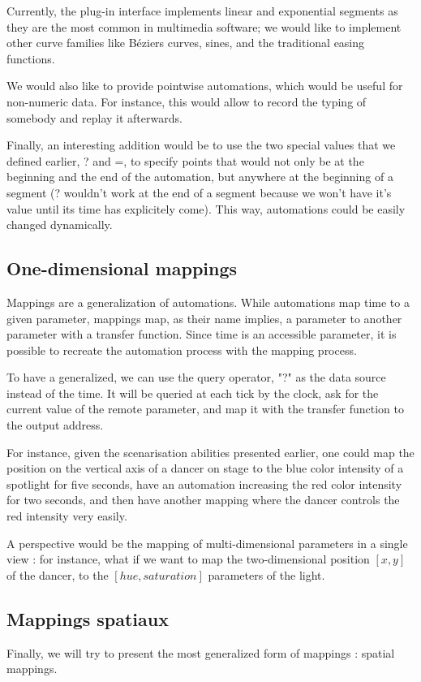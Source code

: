 \documentclass{sigchi}
\begin{document}
Currently, the plug-in interface implements linear and exponential segments as they are the most common in multimedia software; we would like to implement other curve families like Béziers curves, sines, and the traditional easing functions\cite{hudson1993animation}.

We would also like to provide pointwise automations, which would be useful for non-numeric data. For instance, this would allow to record the typing of somebody and replay it afterwards.

Finally, an interesting addition would be to use the two special values that we defined earlier, ? and =, to specify points that would not only be at the beginning and the end of the automation, but anywhere at the beginning of a segment (? wouldn't work at the end of a segment because we won't have it's value until its time has explicitely come). This way, automations could be easily changed dynamically.

\subsection{One-dimensional mappings}
Mappings are a generalization of automations. While automations map time to a given parameter, mappings map, as their name implies, a parameter to another parameter with a transfer function. Since time is an accessible parameter, it is possible to recreate the automation process with the mapping process.

To have a generalized, we can use the query operator, "?" as the data source instead of the time. It will be queried at each tick by the clock, ask for the current value of the remote parameter, and map it with the transfer function to the output address.

For instance, given the scenarisation abilities presented earlier, one could map the position on the vertical axis of a dancer on stage to the blue color intensity of a spotlight for five seconds, have an automation increasing the red color intensity for  two seconds, and then have another mapping where the dancer controls the red intensity very easily.

A perspective would be the mapping of multi-dimensional parameters in a single view : for instance, what if we want to map the two-dimensional position $[x, y]$ of the dancer, to the $[hue, saturation]$ parameters of the light.

\subsection{Mappings spatiaux}
Finally, we will try to present the most generalized form of mappings : spatial mappings.
\end{document}
